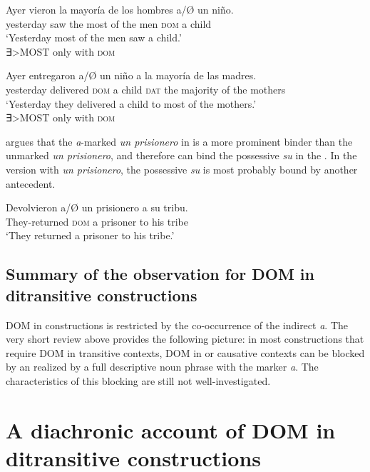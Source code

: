 \documentclass[output=paper]{LSP/langsci}
\begin{document}
\ea%
\label{11-he-ex:41}
\gll Ayer vieron la mayoría de los hombres a/Ø un niño.\\
yesterday saw the most of the men \textsc{dom} a child\\
\glt ‘Yesterday most of the men saw a child.’\\
∃>MOST only with \textsc{dom} %
\z

\ea%
\label{11-he-ex:42}
\gll Ayer entregaron a/Ø un niño a la mayoría de las madres.\\
yesterday delivered \textsc{dom} a child \textsc{dat} the majority of the mothers\\
\glt ‘Yesterday they delivered a child to most of the mothers.’\\
∃>MOST only with \textsc{dom} %
\z
 
\citet[102]{Leonetti2004Specificity} argues that the \textit{a}-marked \textit{un prisionero} in  is a more prominent binder than the unmarked \textit{un prisionero}, and therefore can bind the possessive \textit{su} in the . In the version with \textit{un prisionero}, the possessive \textit{su} is most probably bound by another antecedent.

\ea%
\label{11-he-ex:43}
\gll Devolvieron a/Ø un prisionero a su tribu.\\
They-returned \textsc{dom} a prisoner to his tribe\\
\glt ‘They returned a prisoner to his tribe.’
\z


\subsection{Summary of the observation for DOM in ditransitive constructions}\label{11-subsec:3-4}

DOM in  constructions is restricted by the co-occurrence of the indirect  \textit{a}. The very short review above provides the following picture: in most constructions that require DOM in transitive contexts, DOM in  or causative contexts can be blocked by an  realized by a full descriptive noun phrase with the marker \textit{a}. The characteristics of this blocking are still not well-investigated.

\section{A diachronic account of DOM in ditransitive constructions} %
\label{11-he-sec:4}
\end{document}
